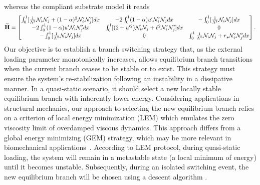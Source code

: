 \documentclass[10pt]{article}
\begin{document}
whereas the compliant substrate model it reads
\begin{equation}
    \widetilde{\mathbf{H}}=
    \begin{bmatrix}
    \int_0^1[ \frac{1}{\Lambda^2}{\mathcal N}_i{\mathcal N}_j + (1-\alpha)^2{\mathcal N}'_i{\mathcal N}'_j] dx&
-2\int_0^1(1-\alpha)u' {\mathcal N}'_i {\mathcal N}_j  dx&
-\int_0^1[\frac{1}{\Lambda^2}{\mathcal N}_i {\mathcal N}_j]  dx\\

-2\int_0^1(1-\alpha)u' {\mathcal N}_i {\mathcal N}'_j dx&
 \int_0^1 [ (2+u'^2){\mathcal N}_i{\mathcal N}_j +\ell^2{\mathcal N}'_i{\mathcal N}'_j] dx&
 0\\

-\int_0^1[\frac{1}{\Lambda^2}{\mathcal N}_i{\mathcal N}_j ] dx
&0
&\int_0^1\frac{1}{\Lambda^2}{\mathcal N}_i {\mathcal N}_j+r_s{\mathcal N}'_i {\mathcal N}'_j  dx
\end{bmatrix}.
\label{eq:stifness2}
\end{equation}
Our objective is to establish a branch switching strategy that,
as the external loading parameter monotonically increases, allows equilibrium branch transitions when the current branch ceases to be stable or to exist.
%
This strategy must ensure the system's re-stabilization following an instability in a dissipative manner. In a quasi-static scenario, it should select a new locally stable equilibrium branch with inherently lower energy.  Considering applications in structural mechanics, our approach to selecting the new equilibrium branch relies on a criterion of local energy minimization (LEM) which emulates the zero viscosity limit of overdamped viscous dynamics. This approach differs from a global energy minimizing (GEM) strategy, which may be more relevant in biomechanical applications~\cite{Salman2021-mn}. According to LEM protocol, during quasi-static loading, the system will remain in a metastable state (a local minimum of energy) until it becomes unstable. Subsequently, during an isolated switching event, the new equilibrium branch will be chosen using a descent algorithm \cite{Puglisi2005-lg}.
\end{document}
